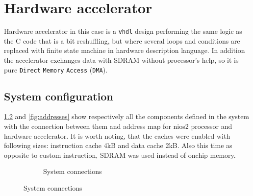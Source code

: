 \begingroup
\renewcommand{\cleardoublepage}{}
\renewcommand{\clearpage}{}
\chapter{Hardware accelerator}
\endgroup
Hardware accelerator in this case is a \verb|vhdl| design performing the same logic as the C code that is a bit reshuffling, but where several loops and conditions are replaced with finite state machine in hardware description language. In addition the accelerator exchanges data with SDRAM without processor's help, so it is pure \verb|Direct| \verb|Memory| \verb|Access| (\verb|DMA|).

\section{System configuration}

\figurename{} \ref{fig:system} and \ref{fig:addresses} show respectively all the components defined in the system with the connection between them and address map for nios2 processor and hardware accelerator. It is worth noting, that the caches were enabled with following sizes: instruction cache 4kB and data cache 2kB. Also this time as opposite to custom instruction, SDRAM was used instead of onchip memory. 

\begin{figure}

\begin{figure}[H]
	\begin{center}
	\end{center}
	\caption{System connections}
	\label{fig:system}
\end{figure}

\end{figure}


